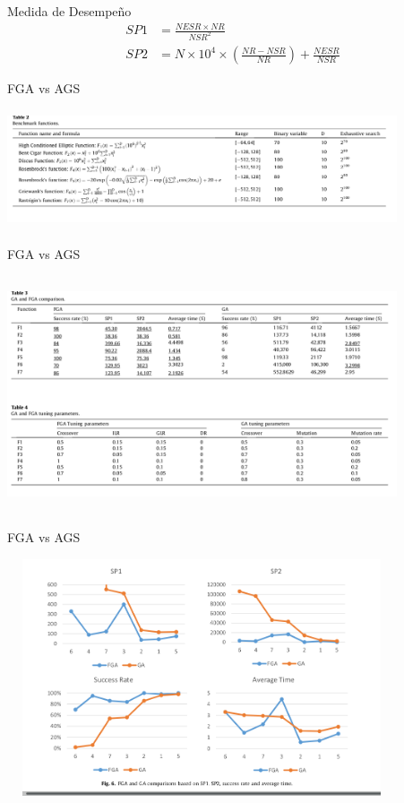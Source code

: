 \documentclass[10pt]{beamer}
\begin{document}
\begin{frame}{Medida de Desempeño}
	\begin{align*}
		SP1 &= \frac{NESR \times NR}{NSR^2}\\
		SP2 &= N \times 10^4 \times (\frac{NR - NSR}{NR}) + \frac{NESR}{NSR}
	\end{align*}
\end{frame}


\begin{frame}{FGA vs AGS}

\includegraphics[width=11.5cm, height=3.5cm]{benchmarkF}

\end{frame}

\begin{frame}{FGA vs AGS}

\includegraphics[width=11.5cm, height=7cm]{resultados}

\end{frame}

\begin{frame}{FGA vs AGS}

\includegraphics[width=11.5cm, height=7cm]{graphs}

\end{frame}
\end{document}
